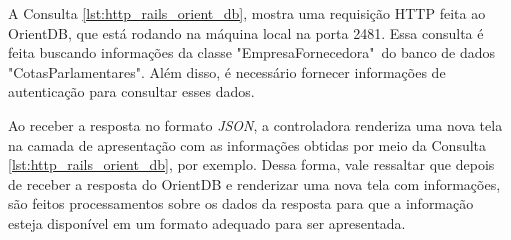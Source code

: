 A Consulta \ref{lst:http_rails_orient_db}, mostra uma requisição HTTP feita ao OrientDB, que está rodando na máquina local na porta 2481. Essa consulta é feita buscando informações da classe "EmpresaFornecedora"\ do banco de dados "CotasParlamentares". Além disso, é necessário fornecer informações de autenticação para consultar esses dados.

Ao receber a resposta no formato \textit{JSON}, a controladora renderiza uma nova tela na camada de apresentação com as informações obtidas por meio da Consulta \ref{lst:http_rails_orient_db}, por exemplo. Dessa forma, vale ressaltar que depois de receber a resposta do OrientDB e renderizar uma nova tela com informações, são feitos processamentos sobre os dados da resposta para que a informação esteja disponível em um formato adequado para ser apresentada.

